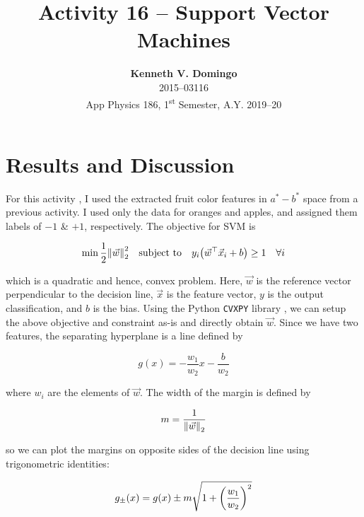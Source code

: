 \documentclass[12pt,a4paper]{article}
\newcommand{\activity}{Activity 16 -- Support Vector Machines}
\begin{document}
\title{\TitleFont \activity}
\author[ ]{\textbf{Kenneth V. Domingo} \\
2015--03116 \\
App Physics 186, 1\textsuperscript{st} Semester, A.Y. 2019--20}

\maketitle
\thispagestyle{titlestyle}

\section*{Results and Discussion}
\setcounter{section}{1}

For this activity \cite{soriano,veksler}, I used the extracted fruit color features in $a^*-b^*$ space from a previous activity. I used only the data for oranges and apples, and assigned them labels of $-1$ \& $+1$, respectively. The objective for SVM is

\begin{equation} \label{eq:objective}
	\min \frac{1}{2} \norm{\vec{w}}_2^2 \quad \textrm{subject to} \quad y_i \qty(\vec{w}^\top \vec{x}_i + b) \geq 1 \quad \forall i
\end{equation}

\noindent which is a quadratic and hence, convex problem. Here, $\vec{w}$ is the reference vector perpendicular to the decision line, $\vec{x}$ is the feature vector, $y$ is the output classification, and $b$ is the bias. Using the Python \texttt{CVXPY} library \cite{cvxpy}, we can setup the above objective and constraint as-is and directly obtain $\vec{w}$. Since we have two features, the separating hyperplane is a line defined by

\begin{equation}
	g(x) = -\frac{w_1}{w_2}x - \frac{b}{w_2}
\end{equation}

\noindent where $w_i$ are the elements of $\vec{w}$. The width of the margin is defined by

\begin{equation}
	m = \frac{1}{\norm{\vec{w}}_2}
\end{equation}

\noindent so we can plot the margins on opposite sides of the decision line using trigonometric identities:

\begin{equation}
	g_\pm(x) = g(x) \pm m \sqrt{1 + \qty(\frac{w_1}{w_2})^2}
\end{equation}
\end{document}
